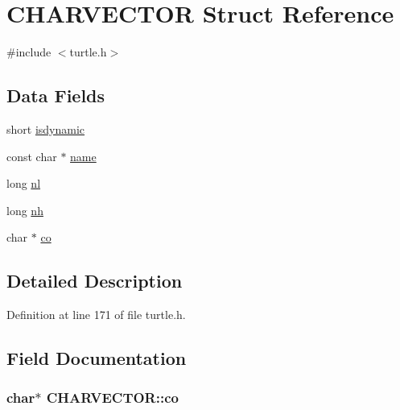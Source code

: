\hypertarget{struct_c_h_a_r_v_e_c_t_o_r}{\section{C\-H\-A\-R\-V\-E\-C\-T\-O\-R Struct Reference}
\label{struct_c_h_a_r_v_e_c_t_o_r}
}


{\ttfamily \#include $<$turtle.\-h$>$}

\subsection*{Data Fields}
\begin{DoxyCompactItemize}
\item 
short \hyperlink{struct_c_h_a_r_v_e_c_t_o_r_a1feff0cafeaa4097ac6c0af7505d8c03}{isdynamic}
\item 
const char $\ast$ \hyperlink{struct_c_h_a_r_v_e_c_t_o_r_ab0655d3029c88c4b6957237c9b5ed6f1}{name}
\item 
long \hyperlink{struct_c_h_a_r_v_e_c_t_o_r_ab77e198892be0e921f5fc2acfa04e4f3}{nl}
\item 
long \hyperlink{struct_c_h_a_r_v_e_c_t_o_r_ac2f6d212310d8164e8923553c7029df0}{nh}
\item 
char $\ast$ \hyperlink{struct_c_h_a_r_v_e_c_t_o_r_a1080943cd1284a6e593f00470ad78744}{co}
\end{DoxyCompactItemize}


\subsection{Detailed Description}


Definition at line 171 of file turtle.\-h.



\subsection{Field Documentation}
\hypertarget{struct_c_h_a_r_v_e_c_t_o_r_a1080943cd1284a6e593f00470ad78744}{
\subsubsection[{co}]{\setlength{\rightskip}{0pt plus 5cm}char$\ast$ C\-H\-A\-R\-V\-E\-C\-T\-O\-R\-::co}}\label{struct_c_h_a_r_v_e_c_t_o_r_a1080943cd1284a6e593f00470ad78744}


